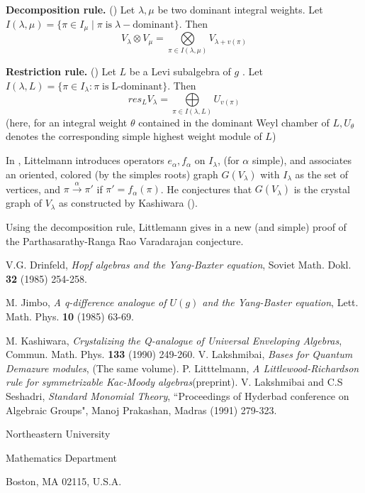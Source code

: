 \medskip
\noindent
{\bfseries Decomposition rule.} (\cite{art10-keyLi}) Let $\lambda, \mu$ be two dominant integral weights. Let $I(\lambda, \mu) = \{\pi \in I_{\mu} \; | \; \pi\; \text{is}\; \lambda-\text{dominant}\}$. Then
$$
V_{\lambda} \otimes V_{\mu} = \bigotimes\limits_{\pi \in I(\lambda, \mu)}V_{\lambda +v(\pi)}
$$

\medskip
\noindent
{\bfseries Restriction rule.} (\cite{art10-keyLi}) Let $L$ be a  Levi subalgebra of $g$ . Let $ I(\lambda, L) = \{\pi \in I_{\lambda}: \pi \; \text{is}\; \text{L-dominant}\}$. Then
$$
res_{L}V_{\lambda} = \bigoplus\limits_{\pi \in I(\lambda, L)}U_{v(\pi)}
$$
(here, for an integral weight $\theta$ contained in the dominant Weyl chamber of $L, U_{\theta}$ denotes the corresponding simple highest weight module of $L$)

In \cite{art10-keyLi}, Littelmann introduces operators $e_{\alpha}, f_{\alpha}$ on $I_{\lambda}$, (for $\alpha$ simple), and associates an oriented, colored (by the simples roots) graph $G(V_{\lambda})$ with $I_{\lambda}$ as the set of vertices, and $\pi \xrightarrow{\alpha} \pi'$ if $\pi' =f_{\alpha}(\pi)$. He conjectures that $ G(V_{\lambda})$ is  the crystal graph of $V_{\lambda}$ as constructed by Kashiwara (\cite{art10-keyK}). 

Using the decomposition rule, Littlemann gives in \cite{art10-keyLi} a new (and simple) proof of the Parthasarathy-Ranga Rao Varadarajan conjecture.

\begin{thebibliography}{99}
 V.G. Drinfeld, \textit{Hopf algebras and the Yang-Baxter equation}, Soviet Math. Dokl. {\bf 32} (1985) 254-258.

 M. Jimbo, \textit{A q-difference analogue of $U(g)$ and the Yang-Baster equation}, Lett. Math. Phys. {\bf 10} (1985) 63-69.

 M. Kashiwara, \textit{Crystalizing the Q-analogue of Universal Enveloping Algebras}, Commun. Math. Phys. {\bf 133} (1990) 249-260.
V. Lakshmibai, \textit{Bases for Quantum Demazure modules}, (The same volume).
 P. Litttelmann, \textit{A Littlewood-Richardson rule for symmetrizable Kac-Moody algebras}(preprint).
 V. Lakshmibai and C.S Seshadri, \textit{Standard Monomial Theory}, ``Proceedings of Hyderbad conference on Algebraic Groups", Manoj Prakashan, Madras (1991) 279-323.
\end{thebibliography}

\begin{flushleft}
Northeastern University

Mathematics Department

Boston, MA 02115, U.S.A.
\end{flushleft}

